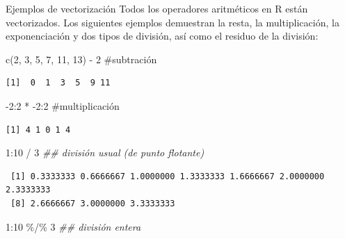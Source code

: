 \documentclass[
  ignorenonframetext,
  aspectratio=169,
  spanish,
]{beamer}
\newenvironment{Shaded}{\begin{snugshade}}{\end{snugshade}}
\newcommand{\CommentTok}[1]{\textcolor[rgb]{0.37,0.37,0.37}{#1}}
\newcommand{\DecValTok}[1]{\textcolor[rgb]{0.68,0.00,0.00}{#1}}
\newcommand{\DocumentationTok}[1]{\textcolor[rgb]{0.37,0.37,0.37}{\textit{#1}}}
\newcommand{\FunctionTok}[1]{\textcolor[rgb]{0.28,0.35,0.67}{#1}}
\newcommand{\NormalTok}[1]{\textcolor[rgb]{0.00,0.23,0.31}{#1}}
\newcommand{\SpecialCharTok}[1]{\textcolor[rgb]{0.37,0.37,0.37}{#1}}
\begin{document}
\begin{frame}[fragile]{Ejemplos de vectorización}
\label{ejemplos-de-vectorizaciuxf3n}
Todos los operadores aritméticos en R están vectorizados. Los siguientes
ejemplos demuestran la resta, la multiplicación, la exponenciación y dos
tipos de división, así como el residuo de la división:

\begin{Shaded}
\begin{Highlighting}[]
\FunctionTok{c}\NormalTok{(}\DecValTok{2}\NormalTok{, }\DecValTok{3}\NormalTok{, }\DecValTok{5}\NormalTok{, }\DecValTok{7}\NormalTok{, }\DecValTok{11}\NormalTok{, }\DecValTok{13}\NormalTok{) }\SpecialCharTok{{-}} \DecValTok{2}  \CommentTok{\#subtración  }
\end{Highlighting}
\end{Shaded}

\begin{verbatim}
[1]  0  1  3  5  9 11
\end{verbatim}

\begin{Shaded}
\begin{Highlighting}[]
\SpecialCharTok{{-}}\DecValTok{2}\SpecialCharTok{:}\DecValTok{2} \SpecialCharTok{*} \SpecialCharTok{{-}}\DecValTok{2}\SpecialCharTok{:}\DecValTok{2} \CommentTok{\#multiplicación }
\end{Highlighting}
\end{Shaded}

\begin{verbatim}
[1] 4 1 0 1 4
\end{verbatim}

\begin{Shaded}
\begin{Highlighting}[]
\DecValTok{1}\SpecialCharTok{:}\DecValTok{10} \SpecialCharTok{/} \DecValTok{3}  \DocumentationTok{\#\# división usual (de punto flotante)}
\end{Highlighting}
\end{Shaded}

\begin{verbatim}
 [1] 0.3333333 0.6666667 1.0000000 1.3333333 1.6666667 2.0000000 2.3333333
 [8] 2.6666667 3.0000000 3.3333333
\end{verbatim}

\begin{Shaded}
\begin{Highlighting}[]
\DecValTok{1}\SpecialCharTok{:}\DecValTok{10} \SpecialCharTok{\%/\%} \DecValTok{3} \DocumentationTok{\#\# división entera }
\end{Highlighting}
\end{Shaded}


\end{frame}
\end{document}
